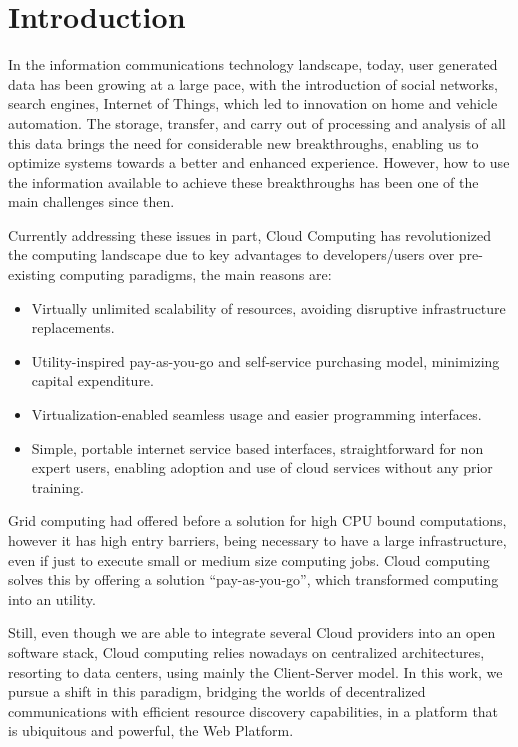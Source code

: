 
%
%

\section{Introduction}

In the information communications technology landscape, today, user generated data has been growing at a large pace, with the introduction of social networks, search engines, Internet of Things, which led to innovation on home and vehicle automation. The storage, transfer, and carry out of processing and analysis of all this data brings the need for considerable new breakthroughs, enabling us to optimize systems towards a better and enhanced experience. However, how to use the information available to achieve these breakthroughs has been one of the main challenges since then.

Currently addressing these issues in part, Cloud Computing has revolutionized the computing landscape due to key advantages to developers/users over pre-existing computing paradigms, the main reasons are:

\begin{itemize}
    \item Virtually unlimited scalability of resources, avoiding disruptive infrastructure replacements.
    \item Utility-inspired pay-as-you-go and self-service purchasing model, minimizing capital expenditure.
    \item Virtualization-enabled seamless usage and easier programming interfaces.
    \item Simple, portable internet service based interfaces, straightforward for non expert users, enabling adoption and use of cloud services without any prior training.
\end{itemize}

Grid computing had offered before a solution for high CPU bound computations, however it has high entry barriers, being necessary to have a large infrastructure, even if just to execute small or medium size computing jobs. Cloud computing solves this by offering a solution ``pay-as-you-go'', which transformed computing into an utility.

Still, even though we are able to integrate several Cloud providers into an open software stack, Cloud computing relies nowadays on centralized architectures, resorting to data centers, using mainly the Client-Server model. In this work, we pursue a shift in this paradigm, bridging the worlds of decentralized communications with efficient resource discovery capabilities, in a platform that is ubiquitous and powerful, the Web Platform.

